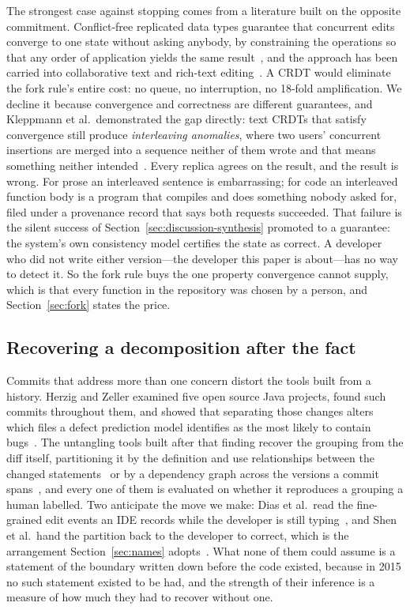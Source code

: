 The strongest case against stopping comes from a literature built on the opposite
commitment. Conflict-free replicated data types guarantee that concurrent edits
converge to one state without asking anybody, by constraining the operations so
that any order of application yields the same result~\cite{shapiro2011}, and the
approach has been carried into collaborative text and rich-text
editing~\cite{litt2022}. A CRDT would eliminate the fork rule's entire cost: no
queue, no interruption, no 18-fold amplification. We decline it because
convergence and correctness are different guarantees, and Kleppmann et al.\
demonstrated the gap directly: text CRDTs that satisfy convergence still produce
\emph{interleaving anomalies}, where two users' concurrent insertions are merged
into a sequence neither of them wrote and that means something neither
intended~\cite{kleppmann2019}. Every replica agrees on the result, and the result
is wrong. For prose an interleaved sentence is embarrassing; for code an
interleaved function body is a program that compiles and does something nobody
asked for, filed under a provenance record that says both requests succeeded.
That failure is the silent success of Section~\ref{sec:discussion-synthesis}
promoted to a guarantee: the system's own consistency model certifies the state
as correct. A developer who did not write either version---the developer this
paper is about---has no way to detect it. So the fork rule buys the one property
convergence cannot supply, which is that every function in the repository was
chosen by a person, and Section~\ref{sec:fork} states the price.

\subsection{Recovering a decomposition after the fact}

Commits that address more than one concern distort the tools built from a history.
Herzig and Zeller examined five open source Java projects, found such commits
throughout them, and showed that separating those changes alters which files a
defect prediction model identifies as the most likely to contain
bugs~\cite{herzig2013,herzig2016}. The untangling tools built after that finding
recover the grouping from the diff itself, partitioning it by the definition and
use relationships between the changed statements~\cite{barnett2015} or by a
dependency graph across the versions a commit spans~\cite{partachi2020}, and every
one of them is evaluated on whether it reproduces a grouping a human labelled. Two
anticipate the move we make: Dias et al.\ read the fine-grained edit events an IDE
records while the developer is still typing~\cite{dias2015}, and Shen et al.\ hand
the partition back to the developer to correct, which is the arrangement
Section~\ref{sec:names} adopts~\cite{shen2021,tao2015,wang2019}. What none of them could
assume is a statement of the boundary written down before the code existed, because
in 2015 no such statement existed to be had, and the strength of their inference is
a measure of how much they had to recover without one.

